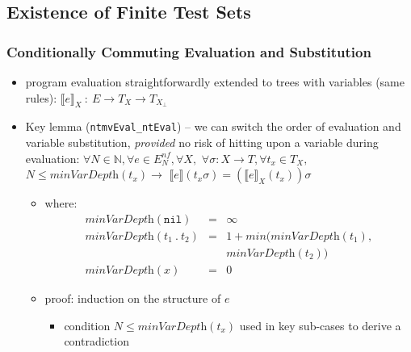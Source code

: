 \documentclass{beamer}
\begin{document}
\subsection{Existence of Finite Test Sets}

\begin{frame}
  \frametitle{Conditionally Commuting Evaluation and Substitution}
  \begin{itemize}
    \item program evaluation straightforwardly extended to trees with variables
      (same rules):
      $\llbracket e \rrbracket_X ~:~ E \rightarrow T_X \rightarrow T_{X_\perp}$
    \item Key lemma (\texttt{ntmvEval\_ntEval}) -- we can switch the order of evaluation 
      and variable substitution, \emph{provided} no risk of hitting upon a variable
      during evaluation:
      $\forall N \in \mathbb{N}, \forall e \in E^{nf}_N, \forall X,$
      $\forall \sigma : X \rightarrow T, \forall t_x \in T_X,$
      $N \le \textit{minVarDepth}(t_x) \rightarrow$
      $\llbracket e \rrbracket(t_x\sigma) = (\llbracket e \rrbracket_X(t_x))\sigma$
      \begin{itemize}
        \item where:
        \[\begin{array}{lcl}
        \textit{minVarDepth}(\texttt{nil}) & = & \infty \\
        \textit{minVarDepth}(t_1 ~.~ t_2) & = & 1 + \textit{min}(\textit{minVarDepth}(t_1), \\
                                          &   &  \textit{minVarDepth}(t_2)) \\
        \textit{minVarDepth}(x) & = & 0
        \end{array}
        \]
        \item proof: induction on the structure of $e$
          \begin{itemize}
            \item condition $N \le \textit{minVarDepth}(t_x)$ used in key sub-cases
              to derive a contradiction
          \end{itemize}
      \end{itemize}
  \end{itemize}
\end{frame}
\end{document}
